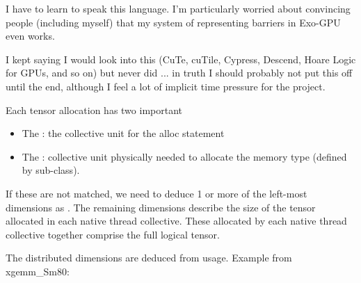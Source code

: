 \filbreak
{} I have to learn to speak this language.
I'm particularly worried about convincing people (including myself) that my system of representing barriers in Exo-GPU even works.

\filbreak
{} I kept saying I would look into this (CuTe, cuTile, Cypress, Descend, Hoare Logic for GPUs, and so on) but never did ... in truth I should probably not put this off until the end, although I feel a lot of implicit time pressure for the project.

\filbreak
{}


Each tensor allocation has two important 
\begin{itemize}
  \item The : the collective unit for the alloc statement
  \item The : collective unit physically needed to allocate the memory type (defined by  sub-class).
\end{itemize}
If these are not matched, we need to deduce 1 or more of the left-most dimensions as .
The remaining dimensions describe the size of the tensor allocated in each native thread collective.
These  allocated by each native thread collective together comprise the full logical tensor.

\filbreak
The distributed dimensions are deduced from usage. Example from xgemm\_Sm80:

\filbreak
{}\\
\\
\\
\\
\\
\\
\\
\\
\\
\\
\\
\\
\\

